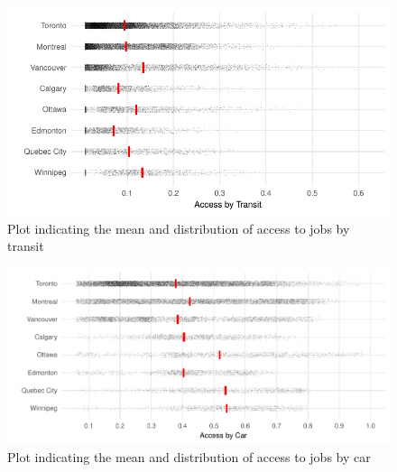 \documentclass[11 pt, letterpaper]{article}
\begin{document}
{%

\begin{figure}[H]
	\vspace{2mm}
	\caption{Plot indicating the mean and distribution of access to jobs by transit} 
	\label{sum_AiT}
	\centerline{\includegraphics[width=5.5in]{figures/summary_plots/summary_AiT.pdf}}
	\vspace{2mm}
\end{figure}

\begin{figure}[H]
	\caption{Plot indicating the mean and distribution of access to jobs by car} 
	\label{sum_AiC}
	\centerline{\includegraphics[width=6.5in]{figures/summary_plots/summary_AiC.pdf}}
	\vspace{0mm}
\end{figure}


}
\end{document}

